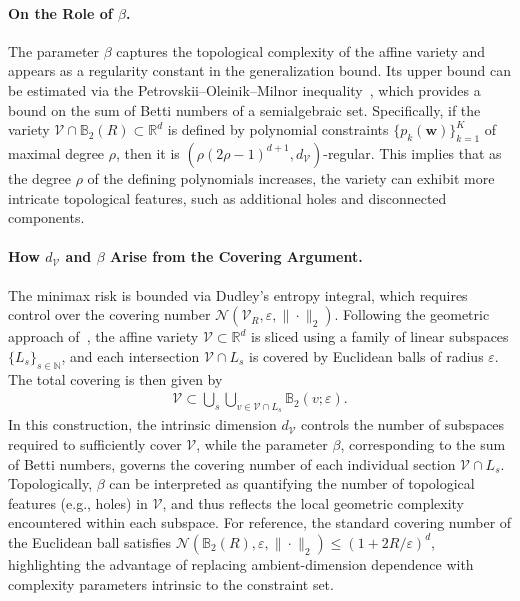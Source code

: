 \documentclass{article}
\theoremstyle{plain}
\theoremstyle{definition}
\theoremstyle{remark}
\begin{document}
\paragraph{On the Role of \(\beta\).}
The parameter \( \beta \) captures the topological complexity of the affine variety and appears as a regularity constant in the generalization bound. Its upper bound can be estimated via the Petrovskii–Oleinik–Milnor inequality~\citep{Petrovskii1949,oleinik1951estimates,milnor1964betti}, which provides a bound on the sum of Betti numbers of a semialgebraic set. Specifically, if the variety \( \mathcal{V} \cap \mathbb{B}_2(R) \subset \mathbb{R}^d \) is defined by polynomial constraints \( \{ p_k(\bm{w}) \}_{k=1}^K \) of maximal degree \( \rho \), then it is \( (\rho(2\rho-1)^{d+1}, d_{\mathcal{V}}) \)-regular. This implies that as the degree \(\rho\) of the defining polynomials increases, the variety can exhibit more intricate topological features, such as additional holes and disconnected components.

\paragraph{How \(d_{\mathcal{V}}\) and \(\beta\) Arise from the Covering Argument.}
The minimax risk is bounded via Dudley’s entropy integral, which requires control over the covering number \( \mathcal{N}(\mathcal{V}_R, \varepsilon, \|\cdot\|_2) \). Following the geometric approach of~\citet{zhang2023covering}, the affine variety \( \mathcal{V} \subset \mathbb{R}^d \) is sliced using a family of linear subspaces \( \{L_s\}_{s \in \mathbb{N}} \), and each intersection \( \mathcal{V} \cap L_s \) is covered by Euclidean balls of radius \( \varepsilon \). The total covering is then given by
\begin{align*}
\mathcal{V} \subset \bigcup_s \bigcup_{v \in \mathcal{V} \cap L_s} \mathbb{B}_2(v;\varepsilon).
\end{align*}
In this construction, the intrinsic dimension \( d_{\mathcal{V}} \) controls the number of subspaces required to sufficiently cover \( \mathcal{V} \), while the parameter \( \beta \), corresponding to the sum of Betti numbers, governs the covering number of each individual section \( \mathcal{V} \cap L_s \). Topologically, \(\beta\) can be interpreted as quantifying the number of topological features (e.g., holes) in \( \mathcal{V} \), and thus reflects the local geometric complexity encountered within each subspace. For reference, the standard covering number of the Euclidean ball satisfies \( \mathcal{N}(\mathbb{B}_2(R), \varepsilon, \|\cdot\|_2) \leq (1+2R/\varepsilon)^d \), highlighting the advantage of replacing ambient-dimension dependence with complexity parameters intrinsic to the constraint set.
\end{document}
